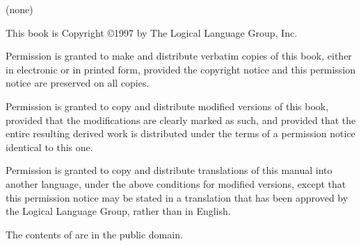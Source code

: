 \begin{example}
(none)
\end{example}



This book is Copyright \copyright 1997 by The Logical Language Group, Inc.

Permission is granted to make and distribute verbatim copies of this book, either in electronic or in printed form, provided the copyright notice and this permission notice are preserved on all copies.

Permission is granted to copy and distribute modified versions of this book, provided that the modifications are clearly marked as such, and provided that the entire resulting derived work is distributed under the terms of a permission notice identical to this one.

Permission is granted to copy and distribute translations of this manual into another language, under the above conditions for modified versions, except that this permission notice may be stated in a translation that has been approved by the Logical Language Group, rather than in English.

The contents of  are in the public domain.
